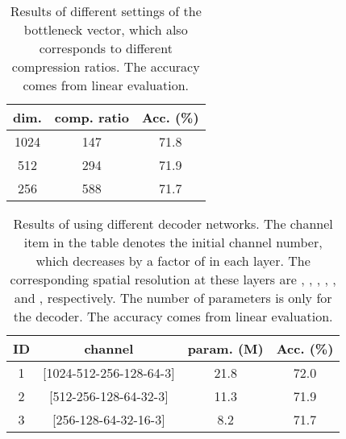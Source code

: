 \documentclass[10pt,twocolumn,letterpaper]{article}
\begin{document}
\setcounter{table}{7}
\begin{table}[]
\vspace{0.05in}
\fontsize{9.0}{10.5}\selectfont
\centering
\setlength{\tabcolsep}{3mm}
\begin{tabular}{c|c|c}
\toprule
dim.  &comp. ratio   & Acc. (\%) \\
\midrule
1024    &147  &71.8 \\ 
512     &294  &71.9 \\
256     &588  &71.7 \\
\bottomrule
\end{tabular}
\caption{Results of different settings of the bottleneck vector, which also corresponds to different compression ratios. The accuracy comes from linear evaluation.}
\label{tab:comp_rate}
\end{table}

\begin{table}[]
\vspace{0.05in}
\fontsize{9.0}{10.5}\selectfont
\centering
\setlength{\tabcolsep}{2mm}
\begin{tabular}{c|c|c|c}
\toprule
ID &channel  &param. (M)   & Acc. (\%) \\
\midrule
1   &[1024-512-256-128-64-3]    &21.8  &72.0 \\ 
2   &[512-256-128-64-32-3]     &11.3  &71.9 \\
3   &[256-128-64-32-16-3]     &8.2  &71.7 \\
\bottomrule
\end{tabular}
\caption{Results of using different decoder networks. The channel item in the table denotes the initial channel number, which decreases by a factor of  in each layer. The corresponding spatial resolution at these layers are , , , , , and , respectively. The number of parameters is only for the decoder. The accuracy comes from linear evaluation.}
\label{tab:decoder}
\end{table}
\end{document}
